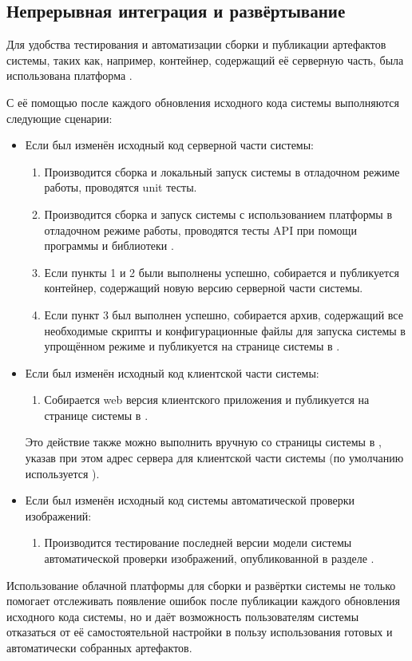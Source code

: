 \subsection{Непрерывная интеграция и развёртывание}

\tab
Для удобства тестирования и автоматизации сборки и публикации артефактов системы, таких как, например,  контейнер, содержащий её серверную часть, была использована платформа .

\tab
С её помощью после каждого обновления исходного кода системы выполняются следующие сценарии:
\begin{itemize}
	\item Если был изменён исходный код серверной части системы:
	\begin{enumerate}
		\item Производится сборка и локальный запуск системы в отладочном режиме работы, проводятся unit тесты.
		\item Производится сборка и запуск системы с использованием платформы  в отладочном режиме работы, проводятся тесты API при помощи программы  и библиотеки .
		\item Если пункты 1 и 2 были выполнены успешно, собирается и публикуется  контейнер, содержащий новую версию серверной части системы.
		\item Если пункт 3 был выполнен успешно, собирается архив, содержащий все необходимые скрипты и конфигурационные файлы для запуска системы в упрощённом режиме и публикуется на странице системы в \cite{project-repo}.
	\end{enumerate}
	\item Если был изменён исходный код клиентской части системы:
	\begin{enumerate}
		\item Собирается web версия клиентского приложения и публикуется на странице системы в \cite{published-version}.
	\end{enumerate}
	Это действие также можно выполнить вручную со страницы системы в , указав при этом адрес сервера для клиентской части системы (по умолчанию используется ).
	\item Если был изменён исходный код системы автоматической проверки изображений:
	\begin{enumerate}
		\item Производится тестирование последней версии модели системы автоматической проверки изображений, опубликованной в разделе .
	\end{enumerate}
\end{itemize}

\tab
Использование облачной платформы для сборки и развёртки системы не только помогает отслеживать появление ошибок после публикации каждого обновления исходного кода системы, но и даёт возможность пользователям системы отказаться от её самостоятельной настройки в пользу использования готовых и автоматически собранных артефактов.
